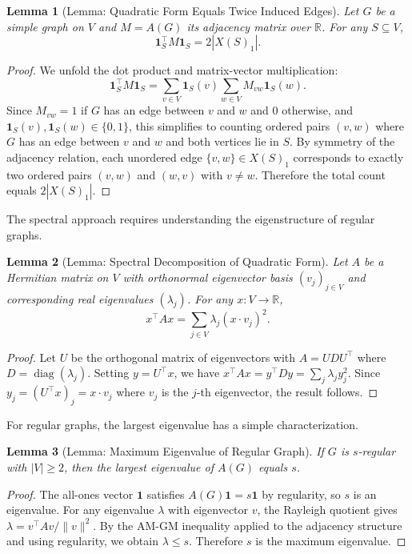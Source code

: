 \documentclass[11pt]{article}
\theoremstyle{plain}
\newtheorem*{lemma}{Lemma}
\theoremstyle{definition}
\theoremstyle{remark}
\begin{document}
\begin{lemma}[Lemma: Quadratic Form Equals Twice Induced Edges]
Let $G$ be a simple graph on $V$ and $M = A(G)$ its adjacency matrix over $\mathbb{R}$. For any $S \subseteq V$,
\[
\mathbf{1}_S^{\top} M \mathbf{1}_S = 2|X(S)_1|.
\]
\end{lemma}

\begin{proof}
We unfold the dot product and matrix-vector multiplication:
\[
\mathbf{1}_S^{\top} M \mathbf{1}_S = \sum_{v \in V} \mathbf{1}_S(v) \sum_{w \in V} M_{vw} \mathbf{1}_S(w).
\]
Since $M_{vw} = 1$ if $G$ has an edge between $v$ and $w$ and $0$ otherwise, and $\mathbf{1}_S(v), \mathbf{1}_S(w) \in \{0,1\}$, this simplifies to counting ordered pairs $(v,w)$ where $G$ has an edge between $v$ and $w$ and both vertices lie in $S$. By symmetry of the adjacency relation, each unordered edge $\{v,w\} \in X(S)_1$ corresponds to exactly two ordered pairs $(v,w)$ and $(w,v)$ with $v \neq w$. Therefore the total count equals $2|X(S)_1|$.
\end{proof}

The spectral approach requires understanding the eigenstructure of regular graphs.

\begin{lemma}[Lemma: Spectral Decomposition of Quadratic Form]
Let $A$ be a Hermitian matrix on $V$ with orthonormal eigenvector basis $(v_j)_{j \in V}$ and corresponding real eigenvalues $(\lambda_j)$. For any $x : V \to \mathbb{R}$,
\[
x^{\top} A x = \sum_{j \in V} \lambda_j (x \cdot v_j)^2.
\]
\end{lemma}

\begin{proof}
Let $U$ be the orthogonal matrix of eigenvectors with $A = UDU^{\top}$ where $D = \operatorname{diag}(\lambda_j)$. Setting $y = U^{\top}x$, we have $x^{\top}Ax = y^{\top}Dy = \sum_j \lambda_j y_j^2$. Since $y_j = (U^{\top}x)_j = x \cdot v_j$ where $v_j$ is the $j$-th eigenvector, the result follows.
\end{proof}

For regular graphs, the largest eigenvalue has a simple characterization.

\begin{lemma}[Lemma: Maximum Eigenvalue of Regular Graph]
If $G$ is $s$-regular with $|V| \geq 2$, then the largest eigenvalue of $A(G)$ equals $s$.
\end{lemma}

\begin{proof}
The all-ones vector $\mathbf{1}$ satisfies $A(G)\mathbf{1} = s\mathbf{1}$ by regularity, so $s$ is an eigenvalue. For any eigenvalue $\lambda$ with eigenvector $v$, the Rayleigh quotient gives $\lambda = v^{\top}Av/\|v\|^2$. By the AM-GM inequality applied to the adjacency structure and using regularity, we obtain $\lambda \leq s$. Therefore $s$ is the maximum eigenvalue.
\end{proof}
\end{document}
